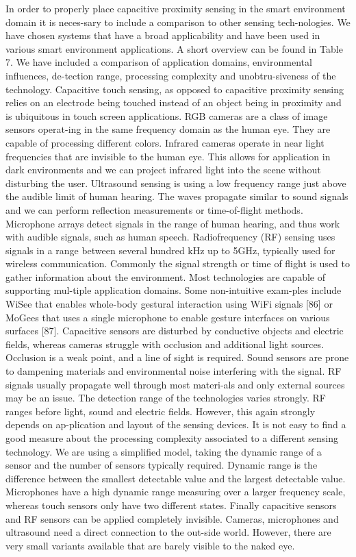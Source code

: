 In order to properly place capacitive proximity sensing in the smart environment domain it is neces-sary to include a comparison to other sensing tech-nologies. We have chosen systems that have a broad applicability and have been used in various smart environment applications. A short overview can be found in Table 7. We have included a comparison of application domains, environmental influences, de-tection range, processing complexity and unobtru-siveness of the technology. 
Capacitive touch sensing, as opposed to capacitive proximity sensing relies on an electrode being touched instead of an object being in proximity and is ubiquitous in touch screen applications.
RGB cameras are a class of image sensors operat-ing in the same frequency domain as the human eye. They are capable of processing different colors.
Infrared cameras operate in near light frequencies that are invisible to the human eye. This allows for application in dark environments and we can project infrared light into the scene without disturbing the user.
Ultrasound sensing is using a low frequency range just above the audible limit of human hearing. The waves propagate similar to sound signals and we can perform reflection measurements or time-of-flight methods.
Microphone arrays detect signals in the range of human hearing, and thus work with audible signals, such as human speech.
Radiofrequency (RF) sensing uses signals in a range between several hundred kHz up to 5GHz, typically used for wireless communication. Commonly the signal strength or time of flight is used to gather information about the environment.
Most technologies are capable of supporting mul-tiple application domains. Some non-intuitive exam-ples include WiSee that enables whole-body gestural interaction using WiFi signals [86] or MoGees that uses a single microphone to enable gesture interfaces on various surfaces [87]. 
Capacitive sensors are disturbed by conductive objects and electric fields, whereas cameras struggle with occlusion and additional light sources. Occlusion is a weak point, and a line of sight is required. Sound sensors are prone to dampening materials and environmental noise interfering with the signal. RF signals usually propagate well through most materi-als and only external sources may be an issue. 
The detection range of the technologies varies strongly. RF ranges before light, sound and electric fields. However, this again strongly depends on ap-plication and layout of the sensing devices.
It is not easy to find a good measure about the processing complexity associated to a different sensing technology. We are using a simplified model, taking the dynamic range of a sensor and the number of sensors typically required. Dynamic range is the difference between the smallest detectable value and the largest detectable value. Microphones have a high dynamic range measuring over a larger frequency scale, whereas touch sensors only have two different states. 
Finally capacitive sensors and RF sensors can be applied completely invisible. Cameras, microphones and ultrasound need a direct connection to the out-side world. However, there are very small variants available that are barely visible to the naked eye.

